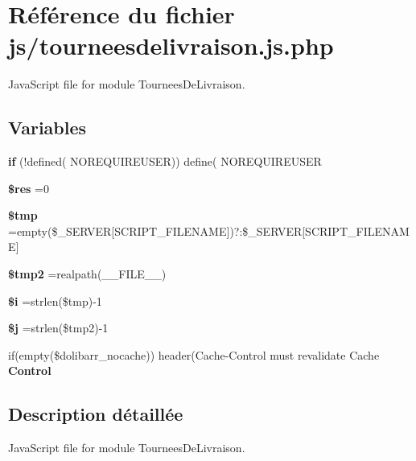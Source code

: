 \hypertarget{tourneesdelivraison_8js_8php}{}\section{Référence du fichier js/tourneesdelivraison.js.\+php}
\label{tourneesdelivraison_8js_8php}


Java\+Script file for module Tournees\+De\+Livraison.  


\subsection*{Variables}
\begin{DoxyCompactItemize}
\item 
\mbox{\label{tourneesdelivraison_8js_8php_a6bd4d8fb9182b6c4bf5c5aacbc55cf4f}} 
{\bfseries if} (!defined( \textquotesingle{}N\+O\+R\+E\+Q\+U\+I\+R\+E\+U\+S\+ER\textquotesingle{})) define( \textquotesingle{}N\+O\+R\+E\+Q\+U\+I\+R\+E\+U\+S\+ER\textquotesingle{}
\item 
\mbox{\label{tourneesdelivraison_8js_8php_a49a8a4009b02e49717caa88b128affc5}} 
{\bfseries \$res} =0
\item 
\mbox{\label{tourneesdelivraison_8js_8php_a57024d47cf8348153f5fdda16f8fefa9}} 
{\bfseries \$tmp} =empty(\$\+\_\+\+S\+E\+R\+V\+ER\mbox{[}\textquotesingle{}S\+C\+R\+I\+P\+T\+\_\+\+F\+I\+L\+E\+N\+A\+ME\textquotesingle{}\mbox{]})?\textquotesingle{}\textquotesingle{}\+:\$\+\_\+\+S\+E\+R\+V\+ER\mbox{[}\textquotesingle{}S\+C\+R\+I\+P\+T\+\_\+\+F\+I\+L\+E\+N\+A\+ME\textquotesingle{}\mbox{]}
\item 
\mbox{\label{tourneesdelivraison_8js_8php_aed9bcb6730d1510376ce80e32bd9504d}} 
{\bfseries \$tmp2} =realpath(\+\_\+\+\_\+\+F\+I\+L\+E\+\_\+\+\_\+)
\item 
\mbox{\label{tourneesdelivraison_8js_8php_a83018d9153d17d91fbcf3bc10158d34f}} 
{\bfseries \$i} =strlen(\$tmp)-\/1
\item 
\mbox{\label{tourneesdelivraison_8js_8php_a6f16db779ef3ccea921b277b5dc245d1}} 
{\bfseries \$j} =strlen(\$tmp2)-\/1
\item 
\mbox{\label{tourneesdelivraison_8js_8php_a675d13e499e57786d6294c2c6926fc21}} 
if(empty(\$dolibarr\+\_\+nocache)) header(\textquotesingle{}Cache-\/Control must revalidate Cache {\bfseries Control}
\end{DoxyCompactItemize}


\subsection{Description détaillée}
Java\+Script file for module Tournees\+De\+Livraison. 

